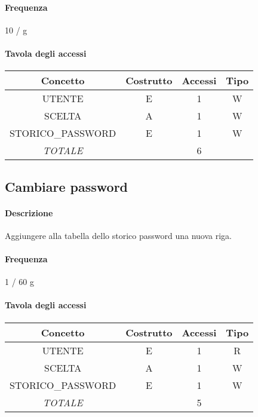 \documentclass[a4paper,12pt]{report}
\begin{document}
\paragraph{Frequenza} 10 / g 
\begin{table}[H]
\paragraph{Tavola degli accessi\newline}
\begin{tabular}{|c|c|c|c|}
\hline
Concetto          & Costrutto & Accessi & Tipo \\ \hline
UTENTE            & E         & 1       & W    \\ \hline
SCELTA           & A         & 1       & W    \\ \hline
STORICO\_PASSWORD & E         & 1       & W    \\ \hline
\textit{TOTALE}   &           & 6       &      \\ \hline
\end{tabular}
\end{table}
\subsection{Cambiare password} \label{cambio_password}
\paragraph{Descrizione} Aggiungere alla tabella dello storico password una nuova riga. 
\paragraph{Frequenza} 1 / 60 g 
\begin{table}[H]
\paragraph{Tavola degli accessi\newline}
\begin{tabular}{|c|c|c|c|}
\hline
Concetto          & Costrutto & Accessi & Tipo \\ \hline
UTENTE            & E         & 1       & R    \\ \hline
SCELTA            & A         & 1       & W    \\ \hline
STORICO\_PASSWORD & E         & 1       & W    \\ \hline
\textit{TOTALE}   &           & 5       &      \\ \hline
\end{tabular}
\end{table}
\end{document}

